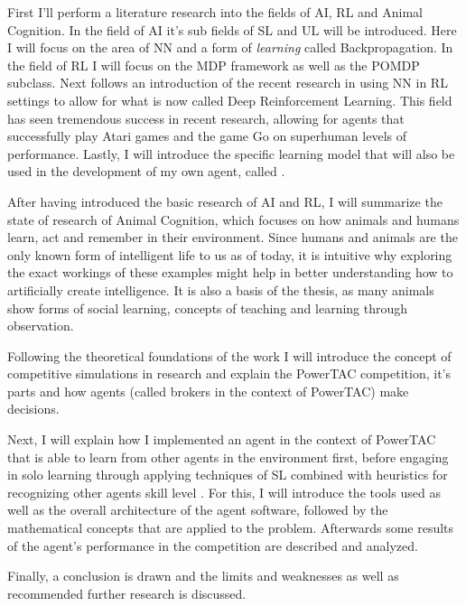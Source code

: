 First I'll perform a literature research into the fields of \ac{AI}, \ac{RL} and Animal Cognition. In the field of AI
it's sub fields of \ac {SL}  and \ac {UL}  will be introduced. Here I will focus on the area of \ac{NN} and a form of \emph{learning}  called Backpropagation. In the field of \ac{RL} I will focus on the \ac{MDP} framework as well as the \ac{POMDP} subclass. 
Next follows an introduction of the recent research in using \ac{NN} in \ac{RL} settings to allow for what is now called Deep Reinforcement Learning. This field has seen tremendous success in recent research, allowing for agents that successfully play 
Atari games and the game Go on superhuman levels of performance.
Lastly, I will introduce the specific learning model that will also be used in the development of my own agent, called %
.

After having introduced the basic research of \ac{AI} and \ac{RL}, I will summarize the state of research of Animal Cognition, which focuses on how animals and humans learn, act and remember in their environment. Since humans and animals are the only known form of intelligent life to us as of today, it is intuitive why exploring the exact workings of these examples might help in better understanding how to artificially create intelligence. It is also a basis of the thesis, as many animals show forms of social learning, concepts of teaching and learning through observation.

Following the theoretical foundations of the work I will introduce the concept of competitive simulations in research and explain the \ac{PowerTAC} competition, it's parts and how agents (called brokers in the context of \ac{PowerTAC}) make decisions. 

Next, I will explain how I implemented an agent in the context of \ac{PowerTAC} that is able to learn from other agents
in the environment first, before engaging in solo learning through applying techniques of \ac{SL}  combined with heuristics for recognizing other agents skill level %
. For this, I will introduce the tools used as well as the overall architecture of the agent software, followed by the mathematical concepts that are applied to the problem. Afterwards some results of the agent's performance in the competition are described and analyzed.

Finally, a conclusion is drawn and the limits and weaknesses as well as recommended further research is discussed.

